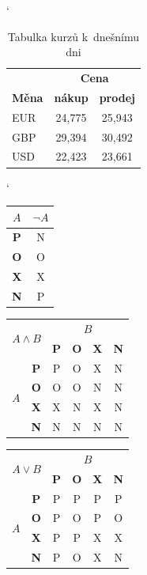 \documentclass[11pt, a4paper, titlepage]{article}
\begin{document}
\bigskip
\begin{table}[h]\catcode`
\centering
\begin{tabular}{|l|c|c|} \hline
& \multicolumn{2}{c|}{\textbf{Cena}}\\
\cline{2-3} \textbf{Měna} & \textbf{nákup} & \textbf{prodej}\\ \hline 
EUR & 24,775 & 25,943\\ 
GBP & 29,394 & 30,492\\
USD & 22,423 & 23,661\\ \hline
\end{tabular}
\caption{Tabulka kurzů k~dnešnímu dni}
\label{tab:tab1}
\end{table}
\bigskip
\begin{table}[h]\catcode`
\centering
\begin{tabular}{|c|c|}
\hline
$A$&$\neg A$\\ \hline
\textbf{P} & N\\ \hline
\textbf{O} & O\\ \hline
\textbf{X} & X\\ \hline
\textbf{N} & P\\ \hline
\end{tabular}
\begin{tabular}{|c|c|c|c|c|c|} \hline
\multicolumn{2}{|c|}{\multirow{2}{*}{$A \land B$}} & \multicolumn{4}{c|}{$B$}\\ \cline{3-6}
\multicolumn{2}{|c|}{} & \textbf{P} & \textbf{O} & \textbf{X} & \textbf{N}\\ \cline{1-6}
\multirow{4}{*}{$A$} & \textbf{P} & P & O & X & N\\ \cline{2-6}
& \textbf{O} & O & O & N & N\\ \cline{2-6}
& \textbf{X} & X & N & X & N\\ \cline{2-6}
& \textbf{N} & N & N & N & N\\ \hline
\end{tabular}
\begin{tabular}{|c|c|c|c|c|c|}\hline
\multicolumn{2}{|c|}{\multirow{2}{*}{$A \lor B$}} & \multicolumn{4}{c|}{$B$}\\ \cline{3-6}
\multicolumn{2}{|c|}{} & \textbf{P} & \textbf{O} & \textbf{X} & \textbf{N}\\ \cline{1-6}
\multirow{4}{*}{$A$} & \textbf{P} & P & P & P & P\\\cline{2-6}
& \textbf{O} & P & O & P & O\\\cline{2-6}
& \textbf{X} & P & P & X & X\\\cline{2-6}
& \textbf{N} & P & O & X & N\\\hline

\end{tabular}
\end{table}
\end{document}
